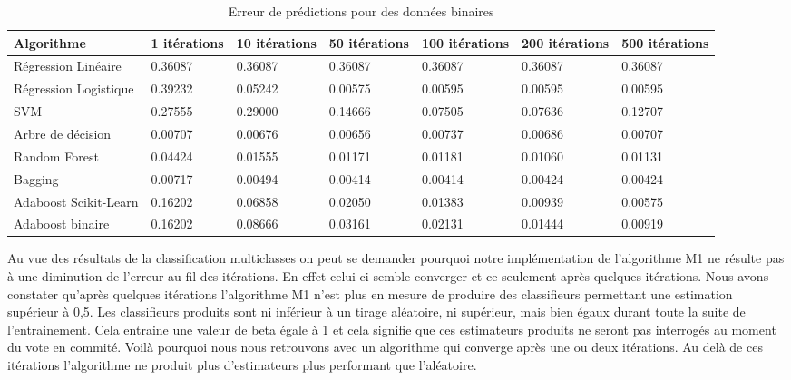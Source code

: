 \documentclass{article}
\begin{document}
\begin{table}[htbp]
    \centering
    \small
    \setlength\tabcolsep{2pt}
    \begin{tabular}{| l | l | l | l | l | l | l |}
    \hline
    Algorithme & 1 itérations & 10 itérations & 50 itérations & 100 itérations & 200 itérations & 500 itérations \\ \hline
    Régression Linéaire & 0.36087 &  0.36087 &  0.36087 & 0.36087 & 0.36087 & 0.36087 \\ \hline
    Régression Logistique & 0.39232 & 0.05242 & 0.00575 & 0.00595 &  0.00595 & 0.00595 \\ \hline
    SVM & 0.27555 & 0.29000 & 0.14666 & 0.07505 & 0.07636 & 0.12707 \\ \hline
    Arbre de décision & 0.00707 & 0.00676 & 0.00656 & 0.00737 & 0.00686 & 0.00707\\ \hline
    Random Forest &  0.04424 & 0.01555 & 0.01171 & 0.01181 & 0.01060 &  0.01131  \\ \hline
    Bagging & 0.00717 & 0.00494 & 0.00414 & 0.00414 & 0.00424 & 0.00424\\ \hline
    Adaboost Scikit-Learn & 0.16202 & 0.06858 &  0.02050 & 0.01383 & 0.00939 & 0.00575\\ \hline
    Adaboost binaire & 0.16202 & 0.08666 & 0.03161 & 0.02131 & 0.01444 & 0.00919\\
    \hline
    \end{tabular}
    \caption{Erreur de prédictions pour des données binaires}
\end{table}

Au vue des résultats de la classification multiclasses on peut se demander pourquoi notre implémentation de l'algorithme M1 ne résulte pas à une diminution de l'erreur au fil des itérations. En effet celui-ci semble converger et ce seulement après quelques itérations. 
Nous avons constater qu'après quelques itérations l'algorithme M1 n'est plus en mesure de produire des classifieurs permettant une estimation supérieur à 0,5. Les classifieurs produits sont ni inférieur à un tirage aléatoire, ni supérieur, mais bien égaux durant toute la suite de l'entrainement. Cela entraine une valeur de beta égale à 1 et cela signifie que ces estimateurs produits ne seront pas interrogés au moment du vote en commité. Voilà pourquoi nous nous retrouvons avec un algorithme qui converge après une ou deux itérations. Au delà de ces itérations l'algorithme ne produit plus d'estimateurs plus performant que l'aléatoire.\\ 
\end{document}
